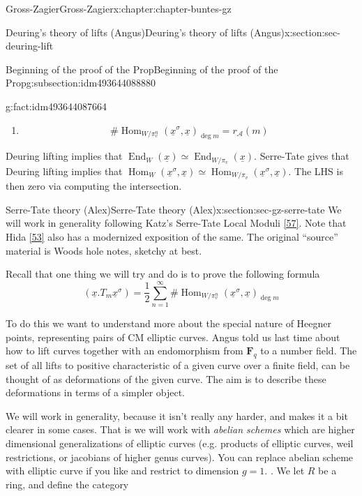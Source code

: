 \documentclass[oneside,10pt,]{book}
\numberwithin{equation}{section}
\newcommand{\FF}{\mathbf{F}}
\DeclareMathOperator{\End}{End}
\DeclareMathOperator{\Hom}{Hom}
\begin{document}
\begin{chapterptx}{Gross-Zagier}{}{Gross-Zagier}{}{}{x:chapter:chapter-buntes-gz}
\begin{sectionptx}{Deuring's theory of lifts (Angus)}{}{Deuring's theory of lifts (Angus)}{}{}{x:section:sec-deuring-lift}
\begin{subsectionptx}{Beginning of the proof of the Prop}{}{Beginning of the proof of the Prop}{}{}{g:subsection:idm493644088880}
\begin{fact}{}{}{g:fact:idm493644087664}
\begin{enumerate}
\begin{equation*}
\end{equation*}
(4.5) in Gross-Zagier%
\item{}%
\begin{equation*}
\# \Hom_{W/\pi _v^n}(\underline x^\sigma , \underline x)_{\deg m} = r_{\mathscr A}(m)
\end{equation*}
%
\end{enumerate}
%
\end{fact}
Deuring lifting implies that \(\End_W(\underline x) \simeq \End_{W/\pi _v}(\underline x)\). Serre-Tate gives that Deuring lifting implies that \(\Hom_W(\underline x^\sigma , \underline x) \simeq \Hom_{W/\pi _v}(\underline x^\sigma , \underline x)\). The LHS is then zero via computing the intersection.%
\end{subsectionptx}
\end{sectionptx}
%
%
\typeout{************************************************}
\typeout{************************************************}
%
\begin{sectionptx}{Serre-Tate theory (Alex)}{}{Serre-Tate theory (Alex)}{}{}{x:section:sec-gz-serre-tate}
We will work in generality following Katz's Serre-Tate Local Moduli \hyperlink{x:biblio:bib-katz-serre-tate}{[57]}. Note that Hida \hyperlink{x:biblio:bib-hida-geometric}{[53]} also has a modernized exposition of the same. The original ``source'' material is Woods hole notes, sketchy at best.%
\par
Recall that one thing we will try and do is to prove the following formula%
\begin{equation*}
(\underline x. T_m \underline x^\sigma ) = \frac12 \sum_{n=1}^\infty  \#\Hom_{W/\pi _v^n}(\underline x^\sigma , \underline x)_{\deg m}
\end{equation*}
%
\par
To do this we want to understand more about the special nature of Heegner points, representing pairs of CM elliptic curves. Angus told us last time about how to lift curves together with an endomorphism from \(\FF_q\) to a number field. The set of all lifts to positive characteristic of a given curve over a finite field, can be thought of as deformations of the given curve. The aim is to describe these deformations in terms of a simpler object.%
\par
We will work in generality, because it isn't really any harder, and makes it a bit clearer in some cases. That is we will work with \emph{abelian schemes} which are higher dimensional generalizations of elliptic curves (e.g. products of elliptic curves, weil restrictions, or jacobians of higher genus curves). You can replace abelian scheme with elliptic curve if you like and restrict to dimension \(g =1\). . We let \(R\) be a ring, and define the category%

\end{sectionptx}
\end{chapterptx}
\end{document}

